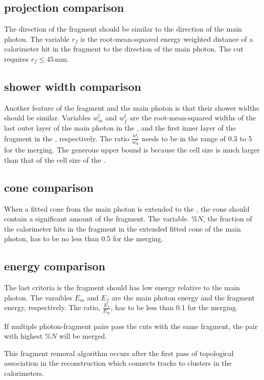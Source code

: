 \subsection{projection comparison}

The direction of the fragment should be similar to the direction of the main photon. The variable  $r_f$ is the root-mean-squared energy weighted distance of a calorimeter hit in the fragment to the direction of the main photon.  The cut requires $ r_f \leqslant 45\,\text{mm}$.

\subsection{shower width comparison}

Another feature of the fragment and the main photon is that their shower widths should be similar. Variables $w^l_m$ and $w^l_f$ are the root-mean-squared widths of the last outer layer of the main photon in the \ECAL, and the first inner layer of the fragment in the \HCAL, respectively. The ratio $\frac{w^l_f}{w^l_m}$ needs to be in the range of 0.3 to 5 for the merging. The generous upper bound is because the \HCAL cell size is much larger than that of the cell size of the \ECAL.

\subsection{cone comparison}

When a fitted cone from the main photon is extended to the \HCAL, the cone should contain a significant amount of the fragment. The variable. $\%{N}$, the fraction of the calorimeter hits in the fragment in the extended fitted cone of the main photon, has to be no less than 0.5 for the merging.

\subsection{energy comparison}


The last criteria is the fragment should has low energy relative to the main photon. The varaibles $E_m$ and $E_f$ are the main photon energy and the fragment energy, respectively. The ratio, $\frac{E_f}{E_m}$, has to be less than 0.1 for the merging.


If multiple photon-fragment pairs pass the cuts with the same fragment, the pair with highest $\%{N}$ will be merged.

This \HCAL fragment removal algorithm occurs after the first pass of topological association in the reconstruction which connects tracks to clusters in the calorimeters.



